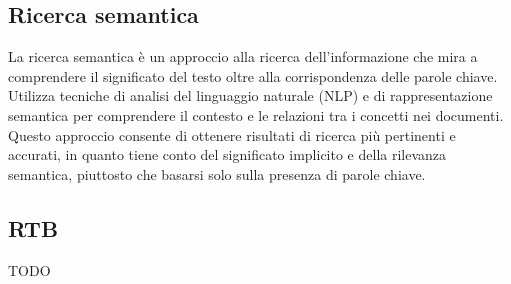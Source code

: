 \vspace{2em}
\subsection*{Ricerca semantica}
La ricerca semantica è un approccio alla ricerca dell'informazione che mira a comprendere il significato del testo oltre alla corrispondenza delle parole chiave. Utilizza tecniche di analisi del linguaggio naturale (NLP) e di rappresentazione semantica per comprendere il contesto e le relazioni tra i concetti nei documenti. Questo approccio consente di ottenere risultati di ricerca più pertinenti e accurati, in quanto tiene conto del significato implicito e della rilevanza semantica, piuttosto che basarsi solo sulla presenza di parole chiave.

\vspace{2em}
\subsection*{RTB}
TODO

